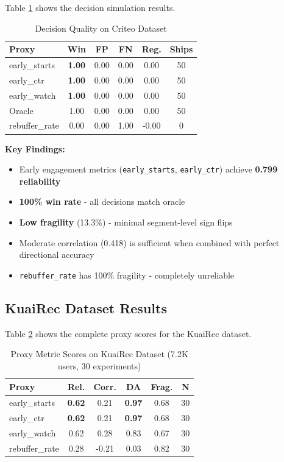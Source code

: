 \documentclass[11pt,twocolumn]{article}
\begin{document}
Table \ref{tab:criteo_decisions} shows the decision simulation results.

\begin{table}[H]
\centering
\caption{Decision Quality on Criteo Dataset}
\label{tab:criteo_decisions}
\small
\begin{tabular}{@{}lccccc@{}}
\toprule
\textbf{Proxy} & \textbf{Win} & \textbf{FP} & \textbf{FN} & \textbf{Reg.} & \textbf{Ships} \\
\midrule
early\_starts & \textbf{1.00} & 0.00 & 0.00 & 0.00 & 50 \\
early\_ctr & \textbf{1.00} & 0.00 & 0.00 & 0.00 & 50 \\
early\_watch & \textbf{1.00} & 0.00 & 0.00 & 0.00 & 50 \\
Oracle & 1.00 & 0.00 & 0.00 & 0.00 & 50 \\
rebuffer\_rate & 0.00 & 0.00 & 1.00 & -0.00 & 0 \\
\bottomrule
\end{tabular}
\end{table}

\textbf{Key Findings:}
\begin{itemize}
    \item Early engagement metrics (\texttt{early\_starts}, \texttt{early\_ctr}) achieve \textbf{0.799 reliability}
    \item \textbf{100\% win rate} - all decisions match oracle
    \item \textbf{Low fragility} (13.3\%) - minimal segment-level sign flips
    \item Moderate correlation (0.418) is sufficient when combined with perfect directional accuracy
    \item \texttt{rebuffer\_rate} has 100\% fragility - completely unreliable
\end{itemize}

\subsection{KuaiRec Dataset Results}

Table \ref{tab:kuairec_scores} shows the complete proxy scores for the KuaiRec dataset.

\begin{table}[H]
\centering
\caption{Proxy Metric Scores on KuaiRec Dataset (7.2K users, 30 experiments)}
\label{tab:kuairec_scores}
\small
\begin{tabular}{@{}lccccc@{}}
\toprule
\textbf{Proxy} & \textbf{Rel.} & \textbf{Corr.} & \textbf{DA} & \textbf{Frag.} & \textbf{N} \\
\midrule
early\_starts & \textbf{0.62} & 0.21 & \textbf{0.97} & 0.68 & 30 \\
early\_ctr & \textbf{0.62} & 0.21 & \textbf{0.97} & 0.68 & 30 \\
early\_watch & 0.62 & 0.28 & 0.83 & 0.67 & 30 \\
rebuffer\_rate & 0.28 & -0.21 & 0.03 & 0.82 & 30 \\
\bottomrule
\end{tabular}
\end{table}
\end{document}
